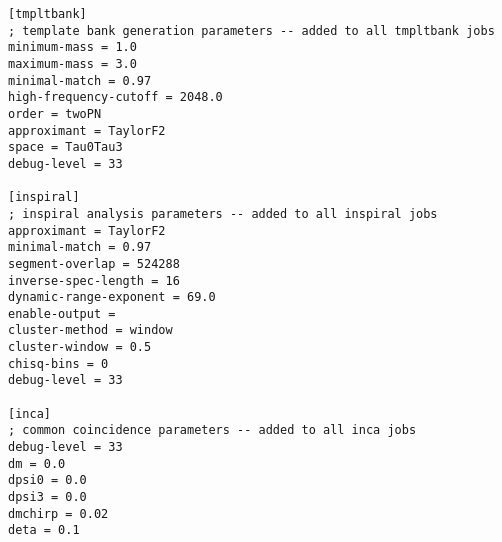 \begin{verbatim}
[tmpltbank]
; template bank generation parameters -- added to all tmpltbank jobs
minimum-mass = 1.0 
maximum-mass = 3.0
minimal-match = 0.97
high-frequency-cutoff = 2048.0
order = twoPN
approximant = TaylorF2
space = Tau0Tau3
debug-level = 33

[inspiral]
; inspiral analysis parameters -- added to all inspiral jobs
approximant = TaylorF2
minimal-match = 0.97
segment-overlap = 524288
inverse-spec-length = 16
dynamic-range-exponent = 69.0
enable-output = 
cluster-method = window
cluster-window = 0.5 
chisq-bins = 0
debug-level = 33

[inca]
; common coincidence parameters -- added to all inca jobs
debug-level = 33
dm = 0.0
dpsi0 = 0.0
dpsi3 = 0.0
dmchirp = 0.02
deta = 0.1
\end{verbatim}
